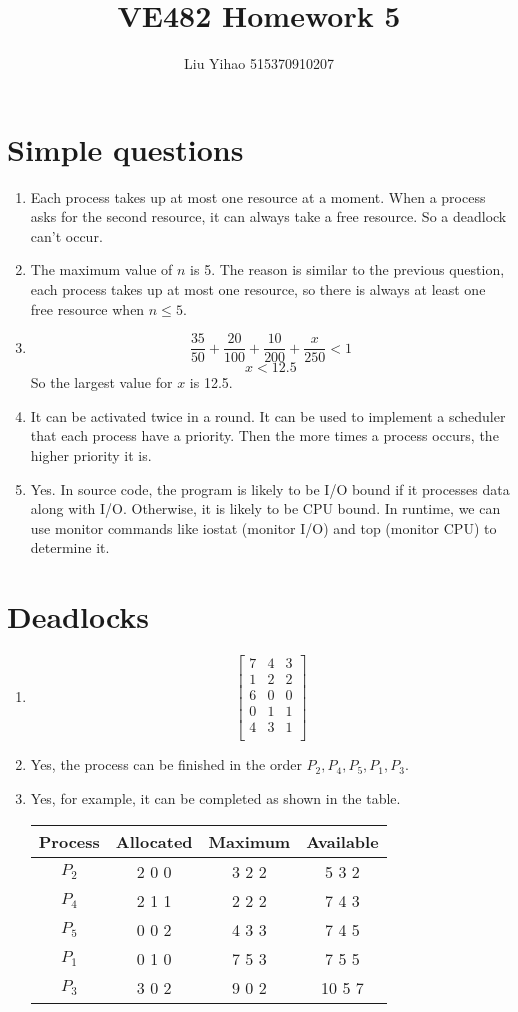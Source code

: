 \documentclass{article}
\title{VE482 Homework 5}
\author{Liu Yihao 515370910207}
\date{}
\begin{document}
\maketitle

\section{Simple questions}
\begin{enumerate}
\item
Each process takes up at most one resource at a moment. When a process asks for the second resource, it can always take a free resource. So a deadlock can't occur.
\item
The maximum value of $n$ is 5. The reason is similar to the previous question, each process takes up at most one resource, so there is always at least one free resource when $n\leqslant 5$.
\item
$$\frac{35}{50}+\frac{20}{100}+\frac{10}{200}+\frac{x}{250}<1$$
$$x<12.5$$
So the largest value for $x$ is 12.5.
\item
It can be activated twice in a round. It can be used to implement a scheduler that each process have a priority. Then the more times a process occurs, the higher priority it is.
\item
Yes. In source code, the program is likely to be I/O bound if it processes data along with I/O. Otherwise, it is likely to be CPU bound. In runtime, we can use monitor commands like iostat (monitor I/O) and top (monitor CPU) to determine it.
\end{enumerate}

\section{Deadlocks}
\begin{enumerate}
\item 
$$\begin{bmatrix}
7 & 4 & 3 \\
1 & 2 & 2 \\
6 & 0 & 0 \\
0 & 1 & 1 \\
4 & 3 & 1 \\
\end{bmatrix}$$
\item
Yes, the process can be finished in the order $P_2,P_4,P_5,P_1,P_3$.
\item
Yes, for example, it can be completed as shown in the table.
\begin{center}
\begin{tabular}{cccc}
\hline
Process & Allocated & Maximum & Available \\\hline
$P_2$ & 2 0 0 & 3 2 2 & 5 3 2 \\
$P_4$ & 2 1 1 & 2 2 2 & 7 4 3 \\
$P_5$ & 0 0 2 & 4 3 3 & 7 4 5 \\
$P_1$ & 0 1 0 & 7 5 3 & 7 5 5 \\
$P_3$ & 3 0 2 & 9 0 2 & 10 5 7\\
\hline 
\end{tabular}
\end{center}
\end{enumerate}
\end{document}
